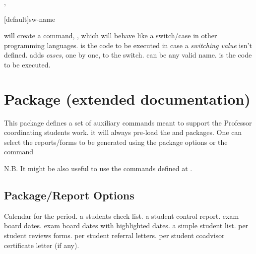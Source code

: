 \documentclass[dctools,english]{ufrgscca} %
\newif\iffulldoc
\begin{document}
\begin{Macros}{\mkswitch,\addcase}
	\begin{Syntax}%
		\Macro{\mkswitch}[default]{sw-name}
	\end{Syntax}
	 will create a command, , which will behave like a switch/case in other programming languages.  is the code to be executed in case a \emph{switching value} isn't defined.
	\Macro{\addcase}{} adds \emph{cases}, one by one, to the switch.  can be any \Macro{\csname}{} valid name.  is the code to be executed.

	\begin{stcode}[st=d.switch]
		\mkswitch[\gr@depcut]\gr@case@angle
		\addcase{}
		\addcase{}
	\end{stcode}
\end{Macros}
\fi

\iffulldoc
\section{ Package (extended documentation)}
This package defines a set of auxiliary commands meant to support the Professor coordinating students work.
it will always pre-load the  and  packages. One can select the reports/forms to be generated using the package options or the command 

N.B. It might be also useful to use the commands defined at .

\subsection{Package/Report Options}\label{ufrgscca-coord.options}
\begin{Options}
	 Calendar for the period.
	 a students check list.
	 a student control report.
	 exam board dates.
	 exam board dates with highlighted dates.
	 a simple student list.
	 per student reviews forms.
	 per student referral letters.
	 per student coadvisor certificate letter (if any).
\end{Options}
\end{document}
